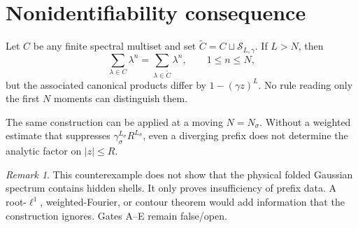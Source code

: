 \documentclass[11pt]{article}
\theoremstyle{remark}\newtheorem{remark}[theorem]{Remark}
\begin{document}
\section{Nonidentifiability consequence}
Let $C$ be any finite spectral multiset and set
$\widetilde C=C\sqcup\mathcal S_{L,\gamma}$.  If $L>N$, then
\[
 \sum_{\lambda\in C}\lambda^n
 =\sum_{\lambda\in\widetilde C}\lambda^n,
 \qquad1\le n\le N,
\]
but the associated canonical products differ by $1-(\gamma z)^L$.
No rule reading only the first $N$ moments can distinguish them.

The same construction can be applied at a moving $N=N_\sigma$.  Without a
weighted estimate that suppresses $\gamma_\sigma^{L_\sigma}R^{L_\sigma}$,
even a diverging prefix does not determine the analytic factor on $|z|\le R$.

\begin{remark}
This counterexample does not show that the physical folded Gaussian spectrum
contains hidden shells.  It only proves insufficiency of prefix data.  A
root-$\ell^1$, weighted-Fourier, or contour theorem would add information that
the construction ignores.  Gates A--E remain false/open.
\end{remark}
\end{document}
